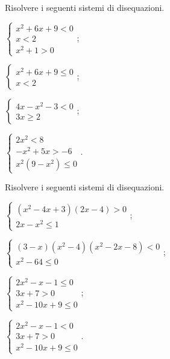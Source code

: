 \begin{esercizio}[\Ast]
 \label{ese:4.77}
Risolvere i seguenti sistemi di disequazioni.
\begin{multicols}{2}
\begin{enumeratea}
\item $\left\{\begin{array}{l}x^2+6x+9<0\\x<2\\x^2+1>0\end{array}\right.$;
\item $\left\{\begin{array}{l}x^2+6x+9\le 0\\x<2\end{array}\right.$;
\item $\left\{\begin{array}{l}4x-x^2-3<0\\3x\ge 2\end{array}\right.$;
\item $\left\{\begin{array}{l}2x^2<8\\-x^2+5x>-6\\x^2(9-x^2)\le 0\end{array}\right.$.
\end{enumeratea}
\end{multicols}
\end{esercizio}

\begin{esercizio}[\Ast]
 \label{ese:4.78}
Risolvere i seguenti sistemi di disequazioni.
\begin{multicols}{2}
\begin{enumeratea}
\item $\left\{\begin{array}{l}(x^2-4x+3)(2x-4)>0\\2x-x^2\le 1\end{array}\right.$;
\item $\left\{\begin{array}{l}(3-x)(x^2-4)(x^2-2x-8)<0\\x^2-64\le 0\end{array}\right.$;
\item $\left\{\begin{array}{l}2x^2-x-1\le 0\\3x+7>0\\x^2-10x+9\le 0\end{array}\right.$;
\item $\left\{\begin{array}{l}2x^2-x-1<0\\3x+7>0\\x^2-10x+9\le 0\end{array}\right.$.
\end{enumeratea}
\end{multicols}
\end{esercizio}

